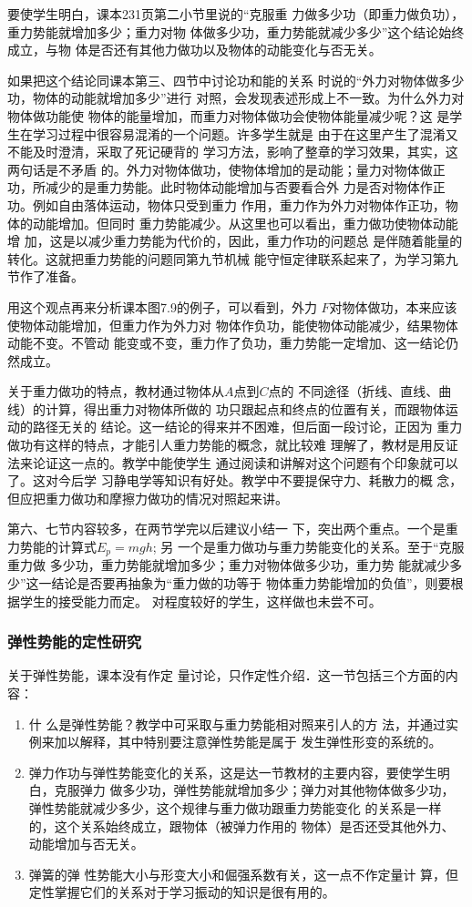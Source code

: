 要使学生明白，课本231页第二小节里说的“克服重
力做多少功（即重力做负功），重力势能就增加多少；重力对物
体做多少功，重力势能就减少多少”这个结论始终成立，与物
体是否还有其他力做功以及物体的动能变化与否无关。

如果把这个结论同课本第三、四节中讨论功和能的关系
时说的“外力对物体做多少功，物体的动能就增加多少”进行
对照，会发现表述形成上不一致。为什么外力对物体做功能使
物体的能量增加，而重力对物体做功会使物体能量减少呢？这
是学生在学习过程中很容易混淆的一个问题。许多学生就是
由于在这里产生了混淆又不能及时澄清，采取了死记硬背的
学习方法，影响了整章的学习效果，其实，这两句话是不矛盾
的。外力对物体做功，使物体增加的是动能；量力对物体做正
功，所减少的是重力势能。此时物体动能增加与否要看合外
力是否对物体作正功。例如自由落体运动，物体只受到重力
作用，重力作为外力对物体作正功，物体的动能增加。但同时
重力势能减少。从这里也可以看出，重力做功使物体动能增
加，这是以减少重力势能为代价的，因此，重力作功的问题总
是伴随着能量的转化。这就把重力势能的问题同第九节机械
能守恒定律联系起来了，为学习第九节作了准备。

用这个观点再来分析课本图7.9的例子，可以看到，外力
$F$对物体做功，本来应该使物体动能增加，但重力作为外力对
物体作负功，能使物体动能减少，结果物体动能不变。不管动
能变或不变，重力作了负功，重力势能一定增加、这一结论仍
然成立。

关于重力做功的特点，教材通过物体从$A$点到$C$点的
不同途径（折线、直线、曲线）的计算，得出重力对物体所做的
功只跟起点和终点的位置有关，而跟物体运动的路径无关的
结论。这一结论的得来并不困难，但后面一段讨论，正因为
重力做功有这样的特点，才能引人重力势能的概念，就比较难
理解了，教材是用反证法来论证这一点的。教学中能使学生
通过阅读和讲解对这个问题有个印象就可以了。这对今后学
习静电学等知识有好处。教学中不要提保守力、耗散力的概
念，但应把重力做功和摩擦力做功的情况对照起来讲。

第六、七节内容较多，在两节学完以后建议小结一
下，突出两个重点。一个是重力势能的计算式$E_p=mgh$; 另
一个是重力做功与重力势能变化的关系。至于“克服重力做
多少功，重力势能就增加多少；重力对物体做多少功，重力势
能就减少多少”这一结论是否要再抽象为“重力做的功等于
物体重力势能增加的负值”，则要根据学生的接受能力而定。
对程度较好的学生，这样做也未尝不可。


\subsubsection{弹性势能的定性研究}

关于弹性势能，课本没有作定
量讨论，只作定性介绍．这一节包括三个方面的内容：
\begin{enumerate}
\item 什
么是弹性势能？教学中可采取与重力势能相对照来引人的方
法，并通过实例来加以解释，其中特别要注意弹性势能是属于
发生弹性形变的系统的。
\item 弹力作功与弹性势能变化的关系，这是达一节教材的主要内容，要使学生明白，克服弹力
做多少功，弹性势能就增加多少；弹力对其他物体做多少功，
弹性势能就减少多少，这个规律与重力做功跟重力势能变化
的关系是一样的，这个关系始终成立，跟物体（被弹力作用的
物体）是否还受其他外力、动能增加与否无关。
\item 弹簧的弹
性势能大小与形变大小和倔强系数有关，这一点不作定量计
算，但定性掌握它们的关系对于学习振动的知识是很有用的。
\end{enumerate}

